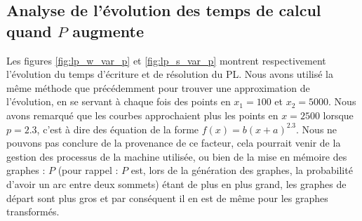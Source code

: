 \documentclass{article}
\begin{document}
\subsection{Analyse de l'évolution des temps de calcul quand $P$ augmente}
Les figures \ref{fig:lp_w_var_p} et \ref{fig:lp_s_var_p} montrent respectivement
l'évolution du temps d'écriture et de résolution du PL. Nous avons utilisé la
même méthode que précédemment pour trouver une approximation de l'évolution, en
se servant à chaque fois des points en $x_1 = 100$ et $x_2=5000$. Nous avons
remarqué que les courbes approchaient plus les points en $x=2500$ lorsque
$p=2.3$, c'est à dire des équation de la forme $f(x) = b(x+a)^{2.3}$. Nous ne
pouvons pas conclure de la provenance de ce facteur, cela pourrait venir de la
gestion des processus de la machine utilisée, ou bien de la mise en mémoire des
graphes : $P$ (pour rappel : $P$ est, lors de la génération des graphes, la
probabilité d'avoir un arc entre deux sommets) étant de plus en plus grand, les
graphes de départ sont plus gros et par conséquent il en est de même pour les
graphes transformés.
\end{document}

